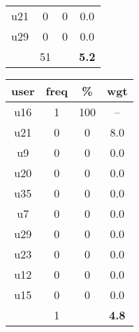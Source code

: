 \begin{appendices}
\begin{table}
\begin{tabular}{ |c|c|c|c| }
	u21 & 0 & 0 & 0.0 \\
	u29 & 0 & 0 & 0.0 \\
	 & 51 & & \textbf{5.2} \\
	\hline
\end{tabular}
\begin{tabular}{ |c|c|c|c| }
	\hline
	\textbf{user} & \textbf{freq} & \textbf{\%} & \textbf{wgt} \\
	\hline
	u16 & 1 & 100 & -- \\
	u21 & 0 & 0 & 8.0 \\
	u9 & 0 & 0 & 0.0 \\
	u20 & 0 & 0 & 0.0 \\
	u35 & 0 & 0 & 0.0 \\
	u7 & 0 & 0 & 0.0 \\
	u29 & 0 & 0 & 0.0 \\
	u23 & 0 & 0 & 0.0 \\
	u12 & 0 & 0 & 0.0 \\
	u15 & 0 & 0 & 0.0 \\
	 & 1 & & \textbf{4.8} \\
	\hline
\end{tabular}
\end{table}


\end{appendices}
